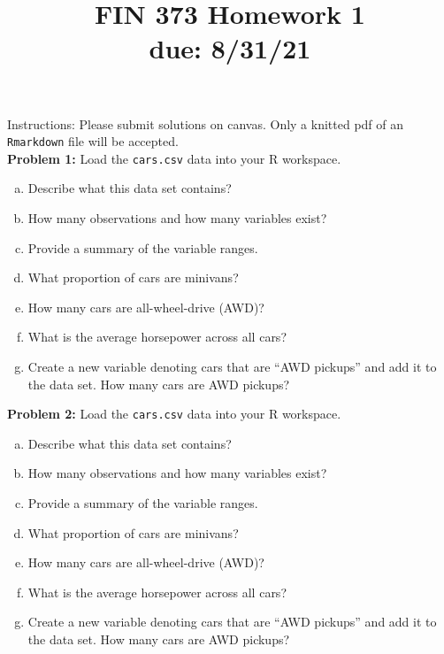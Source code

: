 \documentclass[11pt]{article}
\begin{document}
\title{FIN 373 Homework 1 \\ {\large due: \textbf{8/31/21}}}
\date{}
\maketitle

\vspace{-20mm}

\noindent Instructions: Please submit solutions on canvas.  Only a knitted pdf of an {\tt Rmarkdown} file will be accepted.
\\

\noindent \textbf{Problem 1:} Load the {\tt cars.csv} data into your R workspace.
\begin{enumerate}[a.]
	\item Describe what this data set contains?
	\item How many observations and how many variables exist?
	\item Provide a summary of the variable ranges.
	\item What proportion of cars are minivans?
	\item How many cars are all-wheel-drive (AWD)?
	\item What is the average horsepower across all cars?
	\item Create a new variable denoting cars that are ``AWD pickups'' and add it to the data set.  How many cars are AWD pickups?
\end{enumerate}

\vspace{10mm}

\noindent \textbf{Problem 2:} Load the {\tt cars.csv} data into your R workspace.
\begin{enumerate}[a.]
	\item Describe what this data set contains?
	\item How many observations and how many variables exist?
	\item Provide a summary of the variable ranges.
	\item What proportion of cars are minivans?
	\item How many cars are all-wheel-drive (AWD)?
	\item What is the average horsepower across all cars?
	\item Create a new variable denoting cars that are ``AWD pickups'' and add it to the data set.  How many cars are AWD pickups?
\end{enumerate}
\end{document}
